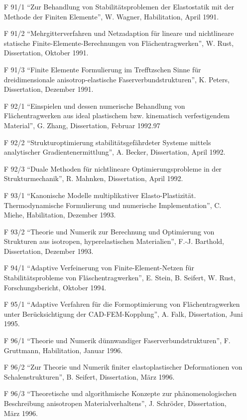 \begin{itemize}
    \item[F 91/1] ``Zur Behandlung von Stabilitätsproblemen der Elastostatik mit der Methode der Finiten Elemente”, W. Wagner, Habilitation, April 1991.
    \item[F 91/2] ``Mehrgitterverfahren und Netzadaption für lineare und nichtlineare statische Finite-Elemente-Berechnungen von Flächentragwerken”, W. Rust, Dissertation, Oktober 1991.
    \item[F 91/3] ``Finite Elemente Formulierung im Trefftzschen Sinne für dreidimensionale anisotrop-elastische Faserverbundstrukturen”, K. Peters, Dissertation, Dezember 1991.
    \item[F 92/1] ``Einspielen und dessen numerische Behandlung von Flächentragwerken aus ideal plastischem bzw. kinematisch verfestigendem Material”, G. Zhang, Dissertation, Februar 1992.97
    \item[F 92/2] ``Strukturoptimierung stabilitätsgefährdeter Systeme mittels analytischer Gradientenermittlung”, A. Becker, Dissertation, April 1992.
    \item[F 92/3] ``Duale Methoden für nichtlineare Optimierungsprobleme in der Strukturmechanik”, R. Mahnken, Dissertation, April 1992.
    \item[F 93/1] ``Kanonische Modelle multiplikativer Elasto-Plastizität. Thermodynamische Formulierung und numerische Implementation”, C. Miehe, Habilitation, Dezember 1993.
    \item[F 93/2] ``Theorie und Numerik zur Berechnung und Optimierung von Strukturen aus isotropen, hyperelastischen Materialien”, F.-J. Barthold, Dissertation, Dezember 1993.
    \item[F 94/1] ``Adaptive Verfeinerung von Finite-Element-Netzen für Stabilitätsprobleme von Fläschentragwerken”, E. Stein, B. Seifert, W. Rust, Forschungsbericht, Oktober 1994.
    \item[F 95/1] ``Adaptive Verfahren für die Formoptimierung von Flächentragwerken unter Berücksichtigung der CAD-FEM-Kopplung”, A. Falk, Dissertation, Juni 1995.
    \item[F 96/1] ``Theorie und Numerik dünnwandiger Faserverbundstrukturen”, F. Gruttmann, Habilitation, Januar 1996.
    \item[F 96/2] ``Zur Theorie und Numerik finiter elastoplastischer Deformationen von Schalenstrukturen”, B. Seifert, Dissertation, März 1996.
    \item[F 96/3] ``Theoretische und algorithmische Konzepte zur phänomenologischen Beschreibung anisotropen Materialverhaltens”, J. Schröder, Dissertation, März 1996.

\end{itemize}
